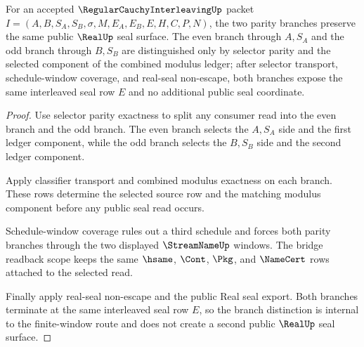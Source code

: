 \begin{theorem}
\label{thm:regular-cauchy-interleaving-window-seal-symmetry}
For an accepted $\RegularCauchyInterleavingUp$ packet $I=(A,B,S_A,S_B,\sigma,M,E_A,E_B,E,H,C,P,N)$, the two parity branches preserve the same public $\RealUp$ seal surface. The even branch through $A,S_A$ and the odd branch through $B,S_B$ are distinguished only by selector parity and the selected component of the combined modulus ledger; after selector transport, schedule-window coverage, and real-seal non-escape, both branches expose the same interleaved seal row $E$ and no additional public seal coordinate.
\end{theorem}
\begin{proof}
Use selector parity exactness to split any consumer read into the even branch and the odd branch. The even branch selects the $A,S_A$ side and the first ledger component, while the odd branch selects the $B,S_B$ side and the second ledger component.

Apply classifier transport and combined modulus exactness on each branch. These rows determine the selected source row and the matching modulus component before any public seal read occurs.

Schedule-window coverage rules out a third schedule and forces both parity branches through the two displayed $\StreamNameUp$ windows. The bridge readback scope keeps the same $\hsame$, $\Cont$, $\Pkg$, and $\NameCert$ rows attached to the selected read.

Finally apply real-seal non-escape and the public Real seal export. Both branches terminate at the same interleaved seal row $E$, so the branch distinction is internal to the finite-window route and does not create a second public $\RealUp$ seal surface.
\end{proof}

